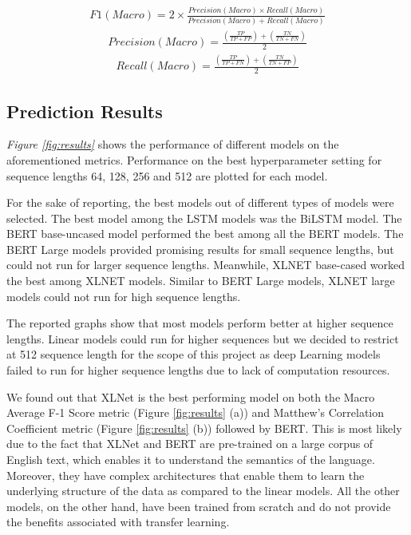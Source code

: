 \documentclass[11pt]{article}
\begin{document}
$$
\begin{aligned}
F1(Macro)  = 2\times\frac{Precision(Macro) \times Recall(Macro)}{Precision(Macro) + Recall(Macro) }
\end{aligned}
$$
$$
\begin{aligned}
Precision(Macro)  = \frac{(\frac{TP}{TP + FP})+ (\frac{TN}{TN + FN})}{2}
\end{aligned}
$$
$$
\begin{aligned}
Recall(Macro)  = \frac{(\frac{TP}{TP + FN})+ (\frac{TN}{TN + FP})}{2}
\end{aligned}
$$

\subsection{Prediction Results}
\textit{Figure \ref{fig:results}} shows the performance of different models on the aforementioned metrics. Performance on the best hyperparameter setting for sequence lengths 64, 128, 256 and 512 are plotted for each model.

For the sake of reporting, the best models out of different types of models were selected. The best model among the LSTM models was the BiLSTM model. The BERT base-uncased model performed the best among all the BERT models. The BERT Large models provided promising results for small sequence lengths, but could not run for larger sequence lengths. Meanwhile, XLNET base-cased worked the best among XLNET models. Similar to BERT Large models, XLNET large models could not run for high sequence lengths.

The reported graphs show that most models perform better at higher sequence lengths. Linear models could run for higher sequences but we decided to restrict at 512 sequence length for the scope of this project as deep Learning models failed to run for higher sequence lengths due to lack of computation resources. 

We found out that XLNet is the best performing model on both the Macro Average F-1 Score metric (Figure \ref{fig:results} (a)) and Matthew’s Correlation Coefficient metric (Figure \ref{fig:results} (b)) followed by BERT. This is most likely due to the fact that XLNet and BERT are pre-trained on a large corpus of English text, which enables it to understand the semantics of the language. Moreover, they have complex architectures that enable them to learn the underlying structure of the data as compared to the linear models. All the other models, on the other hand, have been trained from scratch and do not
provide the benefits associated with transfer learning.
\end{document}
